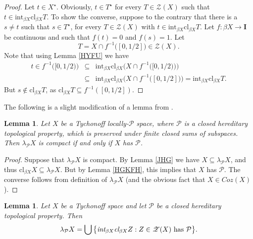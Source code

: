 \documentclass{amsart}
\newtheorem{lemma}[theorem]{Lemma}
\theoremstyle{definition}
\theoremstyle{remark}
\theoremstyle{notation}
\numberwithin{equation}{section}
\begin{document}
\begin{proof}
Let $t\in X^\star$. Obviously, $t\in T^\star$ for every $T\in {\mathscr Z}(X)$ such that $t\in\mbox{int}_{\beta X}\mbox{cl}_{\beta X}T$.
To show the converse, suppose to the contrary that there is a  $s\neq t$  such that $s\in T^\star$, for every $T\in {\mathscr Z}(X)$ with
$t\in\mbox{int}_{\beta X}\mbox{cl}_{\beta X}T$. Let  $f:\beta X\rightarrow{\mathbf I}$ be continuous and such that $f(t)=0$ and
$f(s)=1$. Let
\[T=X\cap f^{-1}\big([0,1/2]\big)\in {\mathscr Z}(X).\]
Note that using Lemma \ref{HYFU} we have
\begin{eqnarray*}
t\in f^{-1}\big([0,1/2)\big)&\subseteq&\mbox{int}_{\beta X}\mbox{cl}_{\beta X}\big(X\cap f^{-1}\big([0,1/2)\big)\big)\\&\subseteq&\mbox{int}_{\beta X}\mbox{cl}_{\beta X}\big(X\cap f^{-1}\big([0,1/2]\big)\big)=\mbox{int}_{\beta X}\mbox{cl}_{\beta X}T.
\end{eqnarray*}
But $s\notin \mbox{cl}_{\beta X}T$, as  $\mbox{cl}_{\beta X}T\subseteq f^{-1}([0,1/2])$.
\end{proof}

The following is a slight modification of a lemma from \cite{Ko3}.

\begin{lemma}\label{KJHG}
Let $X$ be a Tychonoff locally-$\mathcal{P}$ space, where  $\mathcal{P}$ is  a closed hereditary topological property, which  is preserved under  finite
closed sums of subspaces.  Then $\lambda_{{\mathcal P}} X$ is compact if and only if $X$ has $\mathcal{P}$.
\end{lemma}

\begin{proof}
Suppose that $\lambda_{{\mathcal P}} X$ is compact. By Lemma \ref{JHG} we have $X\subseteq\lambda_{{\mathcal P}} X$, and thus $\mbox{cl}_{\beta X}X\subseteq\lambda_{{\mathcal P}} X$. But by Lemma \ref{HGKFH}, this implies that $X$ has $\mathcal{P}$. The converse follows from definition of $\lambda_{{\mathcal P}} X$ (and the  obvious fact that  $X\in Coz(X)$).
\end{proof}

\begin{lemma}\label{FJHSG}
Let $X$ be a Tychonoff space and let $\mathcal{P}$ be a  closed hereditary topological property. Then
\[\lambda_{{\mathcal P}} X=\bigcup\big\{\mbox{\em int}_{\beta X} \mbox{\em cl}_{\beta X}Z:Z\in {\mathscr Z}(X)\mbox{ has } {\mathcal P}\big\}.\]
\end{lemma}
\end{document}
